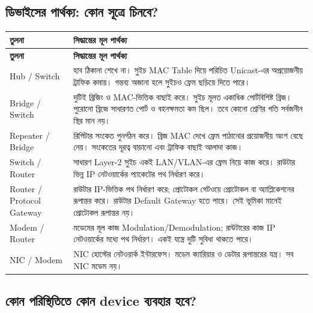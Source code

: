 \subsection{ডিভাইসের পার্থক্য: কোন সূত্রে চিনবে?}
\begin{longtable}{|p{}|p{}|}\hline
\textbf{তুলনা} & \textbf{সিদ্ধান্তের মূল পার্থক্য}\\\hline
\endfirsthead\hline\textbf{তুলনা} & \textbf{সিদ্ধান্তের মূল পার্থক্য}\\\hline\endhead
Hub / Switch & হাব ঠিকানা শেখে না। সুইচ MAC Table দিয়ে পরিচিত Unicast-এর অপ্রয়োজনীয় ট্রাফিক কমায়। গন্তব্য অজানা হলে সুইচও ফ্রেম ছড়িয়ে দিতে পারে।\\\hline
Bridge / Switch & দুটিই ব্রিজিং ও MAC-ভিত্তিক বাছাই করে। সুইচ মূলত একাধিক পোর্টবিশিষ্ট ব্রিজ। পুরোনো ব্রিজে সাধারণত পোর্ট ও বহনক্ষমতা কম ছিল। তবে কোনো শ্রেণির গতি সর্বজনীন স্থির মান নয়।\\\hline
Repeater / Bridge & রিপিটার সংকেত পুনর্গঠন করে। ব্রিজ MAC দেখে ফ্রেম পাঠানোর প্রয়োজনীয় অংশ বেছে নেয়। সংকেতের দূরত্ব বাড়ানো এবং ট্রাফিক বাছাই আলাদা কাজ।\\\hline
Switch / Router & সাধারণ Layer-2 সুইচ একই LAN/VLAN-এর ফ্রেম নিয়ে কাজ করে। রাউটার ভিন্ন IP নেটওয়ার্কের প্যাকেটের পথ নির্ধারণ করে।\\\hline
Router / Protocol Gateway & রাউটার IP-ভিত্তিক পথ নির্ধারণ করে; প্রোটোকল গেটওয়ে প্রোটোকল বা অ্যাপ্লিকেশনের রূপান্তর করে। রাউটার Default Gateway হতে পারে। সেই ভূমিকা মানেই প্রোটোকল রূপান্তর নয়।\\\hline
Modem / Router & মডেমের মূল কাজ Modulation/Demodulation; রাউটারের কাজ IP নেটওয়ার্কের মধ্যে পথ নির্ধারণ। একই যন্ত্রে দুটি সুবিধা থাকতে পারে।\\\hline
NIC / Modem & NIC হোস্টের নেটওয়ার্ক ইন্টারফেস। মডেম ক্যারিয়ার ও ডেটার রূপান্তরের যন্ত্র। সব NIC মডেম নয়।\\\hline
\end{longtable}
\subsection{কোন পরিস্থিতিতে কোন device ব্যবহার হবে?}

